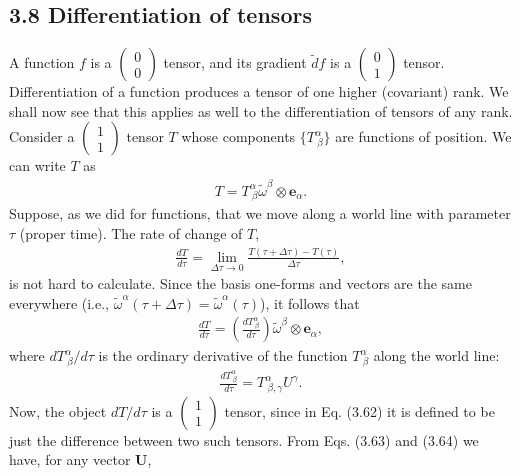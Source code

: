 \documentclass[11pt,letterpaper]{book}
\begin{document}
    \subsection{3.8 Differentiation of tensors}
    A function \(f\) is a \(\left(\begin{array}{c} 0 \\ 0 \end{array}\right)\) tensor, and its gradient \(\tilde{d}f\) is a \(\left(\begin{array}{c} 0 \\ 1 \end{array}\right)\) tensor. Differentiation of a function produces a tensor of one higher (covariant) rank. We shall now see that this applies as well to the differentiation of tensors of any rank. 
    Consider a \(\left(\begin{array}{c} 1 \\ 1 \end{array}\right)\) tensor \(T\) whose components \(\{T^\alpha_{\ \beta}\}\) are functions of position. We can write \(T\) as
    \begin{align}
    T = T^\alpha_{\ \beta} \tilde{\omega}^\beta \otimes \mathbf{e}_\alpha. \tag{3.61}
    \end{align}
    Suppose, as we did for functions, that we move along a world line with parameter \(\tau\) (proper time). The rate of change of \(T\),
    \begin{align}
    \frac{dT}{d\tau} = \lim_{\Delta \tau \rightarrow 0} \frac{T(\tau + \Delta \tau) - T(\tau)}{\Delta \tau}, \tag{3.62}
    \end{align}
    is not hard to calculate. Since the basis one-forms and vectors are the same everywhere (i.e., \(\tilde{\omega}^\alpha(\tau + \Delta \tau) = \tilde{\omega}^\alpha(\tau)\)), it follows that
    \begin{align}
    \frac{dT}{d\tau} = \left(\frac{dT^\alpha_{\ \beta}}{d\tau}\right) \tilde{\omega}^\beta \otimes \mathbf{e}_\alpha, \tag{3.63}
    \end{align}
    where \(dT^\alpha_{\ \beta}/d\tau\) is the ordinary derivative of the function \(T^\alpha_{\ \beta}\) along the world line:
    \begin{align}
    \frac{dT^\alpha_{\ \beta}}{d\tau} = T^\alpha_{\ \beta, \gamma} U^\gamma. \tag{3.64}
    \end{align}
    Now, the object \(dT/d\tau\) is a \(\left(\begin{array}{c} 1 \\ 1 \end{array}\right)\) tensor, since in Eq. (3.62) it is defined to be just the difference between two such tensors. From Eqs. (3.63) and (3.64) we have, for any vector \(\mathbf{U}\),
\end{document}
